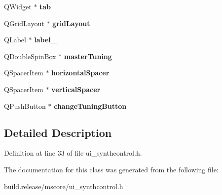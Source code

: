 \begin{DoxyCompactItemize}
Q\+Widget $\ast$ {\bfseries tab}
\item 
\mbox{\label{class_ui___synth_control_a9e7cb95efdb2cb61c2c19614bf062f06}} 
Q\+Grid\+Layout $\ast$ {\bfseries grid\+Layout}
\item 
\mbox{\label{class_ui___synth_control_a10e14af079dfb3abad8423458a19722a}} 
Q\+Label $\ast$ {\bfseries label\+\_}
\item 
\mbox{\label{class_ui___synth_control_ab7fcf8e6b5db20edd30cc97115e93abd}} 
Q\+Double\+Spin\+Box $\ast$ {\bfseries master\+Tuning}
\item 
\mbox{\label{class_ui___synth_control_af6a6c2fe22b0dc960b715dafa9c0257d}} 
Q\+Spacer\+Item $\ast$ {\bfseries horizontal\+Spacer}
\item 
\mbox{\label{class_ui___synth_control_a403fadeff6016f21556609c14fe7a92b}} 
Q\+Spacer\+Item $\ast$ {\bfseries vertical\+Spacer}
\item 
\mbox{\label{class_ui___synth_control_ac95185c831f55fd03ba2963ba184eaff}} 
Q\+Push\+Button $\ast$ {\bfseries change\+Tuning\+Button}
\end{DoxyCompactItemize}


\subsection{Detailed Description}


Definition at line 33 of file ui\+\_\+synthcontrol.\+h.



The documentation for this class was generated from the following file\+:\begin{DoxyCompactItemize}
\item 
build.\+release/mscore/ui\+\_\+synthcontrol.\+h\end{DoxyCompactItemize}
